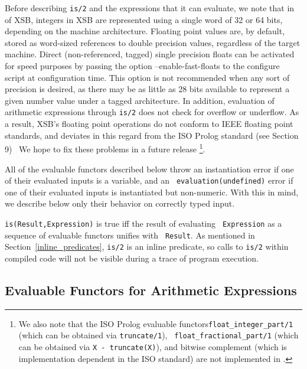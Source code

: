 Before describing {\tt is/2} and the expressions that it can evaluate,
we note that in \version{} of XSB, integers in XSB are represented
using a single word of 32 or 64 bits, depending on the machine
architecture. Floating point values are, by default, stored as
word-sized references to double precision values, regardless of the
target machine. Direct (non-referenced, tagged) single precision
floats can be activated for speed purposes by passing the option
--enable-fast-floats to the configure script at configuration time.
This option is not recommended when any sort of precision is desired,
as there may be as little as 28 bits available to represent a given
number value under a tagged architecture.  In addition, evaluation of
arithmetic expressions through {\tt is/2} does not check for overflow
or underflow.  As a result, XSB's floating point operations do not
conform to IEEE floating point standards, and deviates in this regard
from the ISO Prolog standard (see \cite{ISO-Prolog} Section 9)~ We
hope to fix these problems in a future release \footnote{We also note
  that the ISO Prolog evaluable functors{\tt float\_integer\_part/1}
  (which can be obtained via {\tt truncate/1}), {\tt
    float\_fractional\_part/1} (which can be obtained via {\tt X -
    truncate(X)}), and bitwise complement (which is implementation
  dependent in the ISO standard) are not implemented in \version .}.

All of the evaluable functors described below throw an instantiation
error if one of their evaluated inputs is a variable, and an {\tt
  evaluation(undefined)} error if one of their evaluated inputs is
instantiated but non-numeric.  With this in mind, we describe below
only their behavior on correctly typed input.

\begin{description}
{\tt is(Result,Expression)} is true iff the result of evaluating {\tt
Expression} as a sequence of evaluable functors unifies with {\tt
Result}.  As mentioned in Section~\ref{inline_predicates}, {\tt is/2}
is an inline predicate, so calls to {\tt is/2} within compiled code
will not be visible during a trace of program execution.
\end{description}

\subsection{Evaluable Functors for Arithmetic Expressions} \label{sec:arith-eval}

